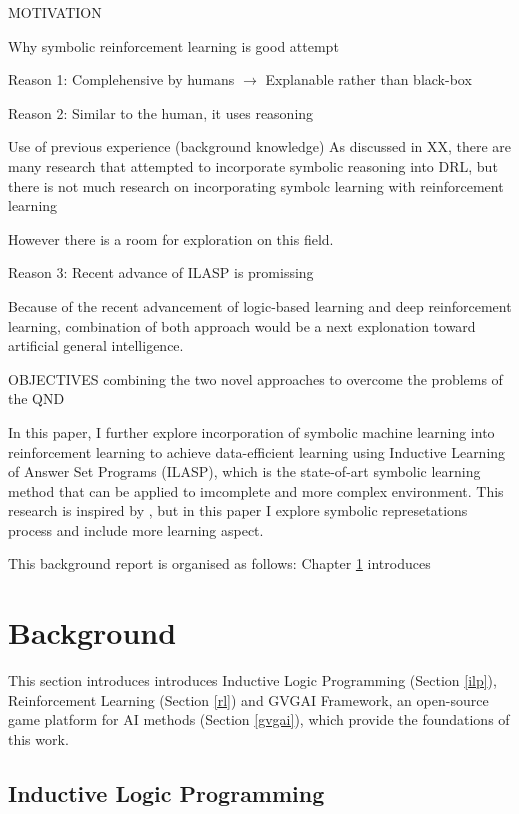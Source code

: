 \documentclass[12pt,twoside]{report}
\begin{document}
MOTIVATION

Why symbolic reinforcement learning is good attempt


Reason 1: Complehensive by humans $\rightarrow$ Explanable rather than black-box

Reason 2: Similar to the human, it uses reasoning

Use of previous experience (background knowledge)
As discussed in XX, there are many research that attempted to incorporate symbolic reasoning into DRL, but there is not much research on incorporating symbolc learning with reinforcement learning

However there is a room for exploration on this field.

Reason 3: Recent advance of ILASP is promissing

Because of the recent advancement of logic-based learning and deep reinforcement learning, combination of both approach would be a next explonation toward artificial general intelligence.


OBJECTIVES
combining the two novel approaches to overcome the problems of the QND





In this paper, I further explore incorporation of symbolic machine learning into reinforcement learning to achieve data-efficient learning using Inductive Learning of Answer Set Programs (ILASP), which is the state-of-art symbolic learning method that can be applied to imcomplete and more complex environment.
This research is inspired by \cite{Garnelo2016}, but in this paper I explore symbolic represetations process and include more learning aspect.

This background report is organised as follows: Chapter \ref{background} introduces

\chapter{Background}
\label{background}

This section introduces introduces Inductive Logic Programming (Section \ref{ilp}), Reinforcement Learning (Section \ref{rl}) and GVGAI Framework, an open-source game platform for AI methods (Section \ref{gvgai}), which provide the foundations of this work.

\section{Inductive Logic Programming}
\end{document}
